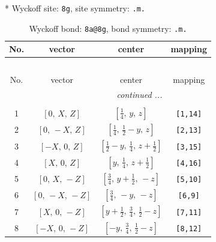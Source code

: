 \documentclass[fleqn,8pt]{jsarticle}
\begin{document}
* Wyckoff site: {\tt 8g}, site symmetry: {\tt .m.}
\renewcommand{\arraystretch}{1.2}
\begin{longtable}{cccc}
\caption{Wyckoff bond: {\tt 8a@8g}, bond symmetry: {\tt .m.}}
 \\
 \hline \hline
No. & vector & center & mapping \\ \hline \endfirsthead

\multicolumn{3}{l}{\tablename\ \thetable{}} \\
 \hline \hline
No. & vector & center & mapping \\ \hline \endhead

 \hline \hline
\multicolumn{3}{r}{\footnotesize\it continued ...} \\ \endfoot

 \hline \hline
\multicolumn{3}{r}{} \\ \endlastfoot

1 & $\left[ 0,\, X,\, Z \right]$ & $\left[ \frac{1}{4},\, y,\, z \right]$ & {\tt [1,14]} \\ \hline
2 & $\left[ 0,\, - X,\, Z \right]$ & $\left[ \frac{1}{4},\, \frac{1}{2} - y,\, z \right]$ & {\tt [2,13]} \\ \hline
3 & $\left[ - X,\, 0,\, Z \right]$ & $\left[ \frac{1}{2} - y,\, \frac{1}{4},\, z + \frac{1}{2} \right]$ & {\tt [3,15]} \\ \hline
4 & $\left[ X,\, 0,\, Z \right]$ & $\left[ y,\, \frac{1}{4},\, z + \frac{1}{2} \right]$ & {\tt [4,16]} \\ \hline
5 & $\left[ 0,\, X,\, - Z \right]$ & $\left[ \frac{3}{4},\, y + \frac{1}{2},\, - z \right]$ & {\tt [5,10]} \\ \hline
6 & $\left[ 0,\, - X,\, - Z \right]$ & $\left[ \frac{3}{4},\, - y,\, - z \right]$ & {\tt [6,9]} \\ \hline
7 & $\left[ X,\, 0,\, - Z \right]$ & $\left[ y + \frac{1}{2},\, \frac{3}{4},\, \frac{1}{2} - z \right]$ & {\tt [7,11]} \\ \hline
8 & $\left[ - X,\, 0,\, - Z \right]$ & $\left[ - y,\, \frac{3}{4},\, \frac{1}{2} - z \right]$ & {\tt [8,12]} \\
\end{longtable}
\renewcommand{\arraystretch}{1.2}
\end{document}

